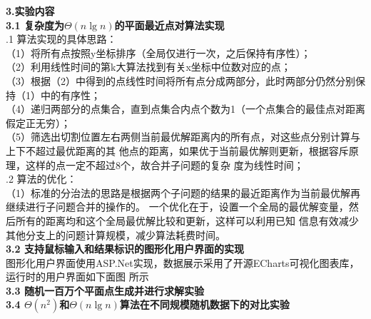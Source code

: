 \documentclass[a4paper]{article}
\begin{document}
\begin{enumerate}
  \textbf{3.实验内容}\\
  \textbf{3.1 复杂度为$\Theta(n\lg n)$的平面最近点对算法实现}\\
  .1 算法实现的具体思路：\\
  （1）将所有点按照y坐标排序（全局仅进行一次，之后保持有序性）；\\
  （2）利用线性时间的第k大算法找到有关x坐标中位数对应的点；\\
  （3）根据（2）中得到的点线性时间将所有点分成两部分，此时两部分仍然分别保持（1）中的有序性；\\
  （4）递归两部分的点集合，直到点集合内点个数为1（一个点集合的最佳点对距离假定正无穷）；\\
  （5）筛选出切割位置左右两侧当前最优解距离内的所有点，对这些点分别计算与上下不超过最优距离的其
  他点的距离，如果优于当前最优解则更新，根据容斥原理，这样的点一定不超过8个，故合并子问题的复杂
  度为线性时间；\\
  .2 算法的优化：\\
  （1）标准的分治法的思路是根据两个子问题的结果的最近距离作为当前最优解再继续进行子问题合并的操作的。
  一个优化在于，设置一个全局的最优解变量，然后所有的距离均和这个全局最优解比较和更新，这样可以利用已知
  信息有效减少其他分支上的问题计算规模，减少算法耗费时间。\\
  \medskip
  \textbf{3.2 支持鼠标输入和结果标识的图形化用户界面的实现}\\
  图形化用户界面使用ASP.Net实现，数据展示采用了开源ECharts可视化图表库，运行时的用户界面如下面图
  所示\\
  \medskip
  \textbf{3.3 随机一百万个平面点生成并进行求解实验}\\
  \medskip
  \textbf{3.4 $\Theta(n^2)$和$\Theta(n\lg n)$算法在不同规模随机数据下的对比实验}
  \\
\end{enumerate}
\end{document}
